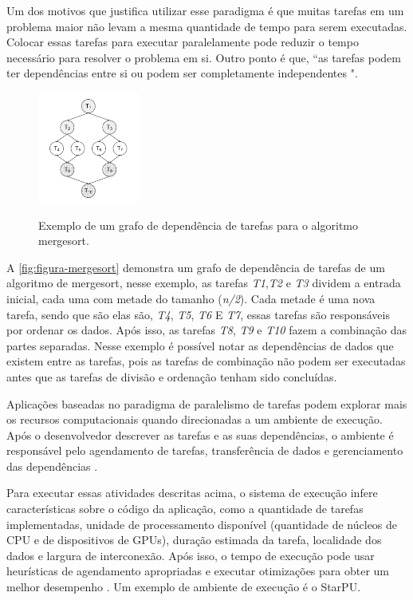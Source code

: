 Um dos motivos que justifica utilizar esse paradigma é que muitas tarefas em um problema maior não levam a mesma quantidade de tempo para serem executadas.
Colocar essas tarefas para executar paralelamente pode reduzir o tempo necessário para resolver o problema em si.
Outro ponto é que, “as tarefas podem ter dependências entre si ou podem ser completamente independentes \cite{pinto2013escalonamento}".

\begin{figure}[!htb]
    \centering
    \caption{Exemplo de um grafo de dependência de tarefas para o algoritmo mergesort.}
    \includegraphics[width=0.3\textwidth]{./dados/figuras/mergesort}
    \label{fig:figura-mergesort}
\end{figure}

A \autoref{fig:figura-mergesort} demonstra um grafo de dependência de tarefas de um algoritmo de mergesort, nesse exemplo, as tarefas \emph{T1},\emph{T2} e \emph{T3} dividem a entrada inicial, cada uma com metade do tamanho (\emph{n/2}).
Cada metade é uma nova tarefa, sendo que são elas são, \emph{T4}, \emph{T5}, \emph{T6} E \emph{T7}, essas tarefas são responsáveis por ordenar os dados.
Após isso, as tarefas \emph{T8}, \emph{T9} e \emph{T10} fazem a combinação das partes separadas.
Nesse exemplo é possível notar as dependências de dados que existem entre as tarefas, pois as tarefas de combinação não podem ser executadas antes que as tarefas de divisão e ordenação tenham sido concluídas.

Aplicações baseadas no paradigma de paralelismo de tarefas podem explorar mais os recursos computacionais quando direcionadas a um ambiente de execução.
Após o desenvolvedor descrever as tarefas e as suas dependências, o ambiente é responsável pelo agendamento de tarefas, transferência de dados e gerenciamento das dependências \cite{pinto2017visual}.

Para executar essas atividades descritas acima, o sistema de execução infere características sobre o código da aplicação, como a quantidade de tarefas implementadas, unidade de processamento disponível (quantidade de núcleos de CPU e de dispositivos de GPUs), duração estimada da tarefa, localidade dos dados e largura de interconexão.
Após isso, o tempo de execução pode usar heurísticas de agendamento apropriadas e executar otimizações para obter um melhor desempenho \cite{pinto2017visual}.
Um exemplo de ambiente de execução é o StarPU.

